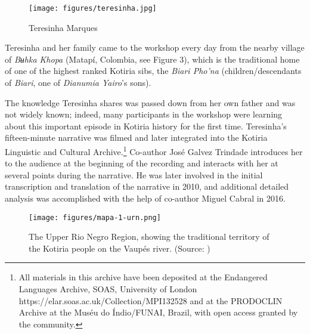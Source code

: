 \documentclass[output=paper,
modfonts,nonflat
]{langsci/langscibook}
\begin{document}
\def\oldIntextsep{\the\intextsep}
\setlength{\intextsep}{0.25\baselineskip}
\begin{wrapfigure}{l}{7.5 cm}
  \texttt{[image: figures/teresinha.jpg]}
  \caption{Teresinha Marques}
  \label{fig:teresinha}
\end{wrapfigure}
\setlength{\intextsep}{\oldIntextsep}

Teresinha and her family came to the workshop every day from the nearby village of \textit{Bʉhka Khopa} (Matapí, Colombia, see Figure 3), which is the traditional home of one of the highest ranked Kotiria sibs, the \textit{Biari Pho’na} (children/descendants of \textit{Biari}, one of \textit{Dianumia Yairo}'s sons).   
    
The knowledge Teresinha shares was passed down from her own father and was not widely known; indeed, many participants in the workshop were learning about this important episode in Kotiria history for the first time. Teresinha’s fifteen-minute narrative was filmed and later integrated into the Kotiria Linguistic and Cultural Archive.\footnote{All materials in this archive have been deposited at the Endangered Languages Archive, SOAS, University of London https://elar.soas.ac.uk/Collection/MPI132528 and at the PRODOCLIN Archive at the Muséu do Índio/FUNAI, Brazil, with open access granted by the community.} Co-author José Galvez Trindade introduces her to the audience at the beginning of the recording and interacts with her at several points during the narrative. He was later involved in the initial transcription and translation of the narrative in 2010, and additional detailed analysis was accomplished with the help of co-author Miguel Cabral in 2016.
    
\begin{figure}[t]
\texttt{[image: figures/mapa-1-urn.png]}
\caption{The Upper Rio Negro Region, showing the traditional territory of the Kotiria people on the Vaupés river. (Source: \citealt[9]{Stenzel2013})\label{mapone}} 
\end{figure}
\end{document}
